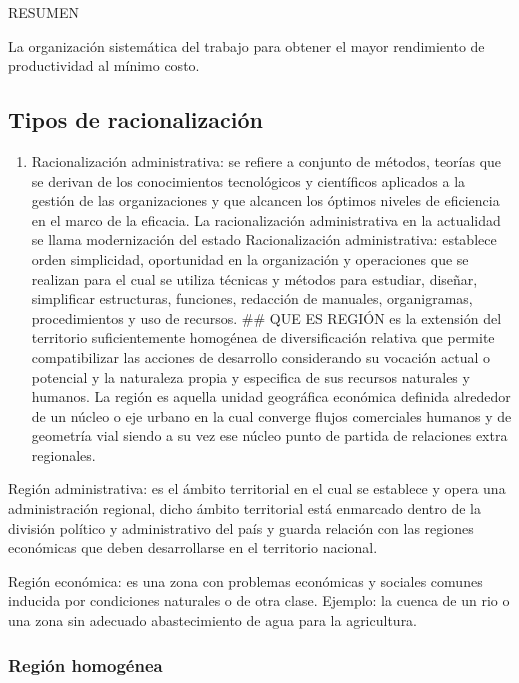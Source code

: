 \documentclass[
  jou,
  floatsintext,
  longtable,
  a4paper,
  nolmodern,
  notxfonts,
  notimes,
  12pt,
  colorlinks=true,linkcolor=blue,citecolor=blue,urlcolor=blue]{apa7}
\providecommand{\tightlist}{%
  \setlength{\itemsep}{0pt}\setlength{\parskip}{0pt}}
\begin{document}
RESUMEN

La organización sistemática del trabajo para obtener el mayor
rendimiento de productividad al mínimo costo.

\subsection{Tipos de racionalización}\label{tipos-de-racionalizaciuxf3n}

\begin{enumerate}
\def\labelenumi{\arabic{enumi}.}
\tightlist
\item
  Racionalización administrativa: se refiere a conjunto de métodos,
  teorías que se derivan de los conocimientos tecnológicos y científicos
  aplicados a la gestión de las organizaciones y que alcancen los
  óptimos niveles de eficiencia en el marco de la eficacia. La
  racionalización administrativa en la actualidad se llama modernización
  del estado Racionalización administrativa: establece orden
  simplicidad, oportunidad en la organización y operaciones que se
  realizan para el cual se utiliza técnicas y métodos para estudiar,
  diseñar, simplificar estructuras, funciones, redacción de manuales,
  organigramas, procedimientos y uso de recursos. \#\# QUE ES REGIÓN es
  la extensión del territorio suficientemente homogénea de
  diversificación relativa que permite compatibilizar las acciones de
  desarrollo considerando su vocación actual o potencial y la naturaleza
  propia y especifica de sus recursos naturales y humanos. La región es
  aquella unidad geográfica económica definida alrededor de un núcleo o
  eje urbano en la cual converge flujos comerciales humanos y de
  geometría vial siendo a su vez ese núcleo punto de partida de
  relaciones extra regionales.
\end{enumerate}

Región administrativa: es el ámbito territorial en el cual se establece
y opera una administración regional, dicho ámbito territorial está
enmarcado dentro de la división político y administrativo del país y
guarda relación con las regiones económicas que deben desarrollarse en
el territorio nacional.

Región económica: es una zona con problemas económicas y sociales
comunes inducida por condiciones naturales o de otra clase. Ejemplo: la
cuenca de un rio o una zona sin adecuado abastecimiento de agua para la
agricultura.

\subsubsection{Región homogénea}\label{regiuxf3n-homoguxe9nea}
\end{document}
